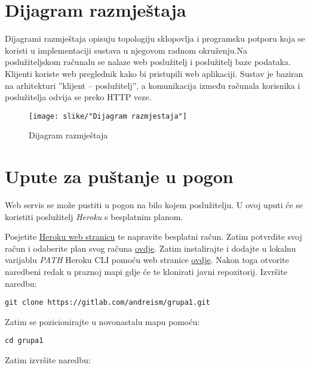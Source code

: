 		
		\section{Dijagram razmještaja}
			Dijagrami razmještaja opisuju topologiju sklopovlja i programsku potporu koja se koristi u implementaciji sustava u njegovom radnom okruženju.Na poslužiteljskom	računalu se nalaze web poslužitelj i poslužitelj baze podataka. Klijenti koriste web preglednik kako bi pristupili web aplikaciji. Sustav je baziran na arhitekturi ”klijent – poslužitelj”, a komunikacija između računala korisnika i poslužitelja odvija se preko HTTP veze.\\
			\begin{figure}[H]
				\texttt{[image: slike/"Dijagram razmjestaja"]}
				\centering
				\caption{Dijagram razmještaja}
				\label{dijagram razmjestaja}
			\end{figure}
						
			\eject 
		
		\section{Upute za puštanje u pogon}
		
			
			 
			
			\newcommand{\code}[1]{\colorbox{light-gray}{\texttt{#1}}}
			 
			 Web servis se može pustiti u pogon na bilo kojem poslužitelju. U ovoj uputi će se koristiti poslužitelj \textit{Heroku} s besplatnim planom.
			 
			 Posjetite \href{https://www.heroku.com/}{Heroku web stranicu} te napravite besplatni račun. Zatim potvrdite svoj račun i odaberite plan svog računa \href{https://devcenter.heroku.com/articles/account-verification}{ovdje}. Zatim instalirajte i dodajte u lokalnu varijablu \textit{PATH} Heroku CLI pomoću web stranice \href{https://devcenter.heroku.com/articles/getting-started-with-nodejs#set-up}{ovdje}. Nakon toga otvorite naredbeni redak u praznoj mapi gdje će te klonirati javni repozitorij. Izvršite naredbu:
			 
			 \code{git clone https://gitlab.com/andreism/grupa1.git}
			 
			 \noindent
			 Zatim se pozicionirajte u novonastalu mapu pomoću:
			 
			 \code{cd grupa1}
			 
			 \noindent
			 Zatim izvršite naredbu:
			 
